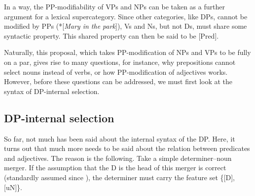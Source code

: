 \documentclass[output=paper
,modfonts
,nonflat]{langsci/langscibook}
\begin{document}
\begin{figure}[!h]
	\begin{exe}
	\end{exe}
\end{figure} 
\noindent In a way, the PP-modifiability of VPs and NPs can be taken as a further argument for a lexical supercategory. Since other categories, like DPs, cannot be modified by PPs (*[\textit{Mary in the park}]), Vs and Ns, but not Ds, must share some syntactic property. This shared property can then be said to be [Pred].

Naturally, this proposal, which takes PP-modification of NPs and VPs to be fully on a par, gives rise to many questions, for instance, why prepositions cannot select nouns instead of verbs, or how PP-modification of adjectives works. However, before these questions can be addressed, we must first look at the syntax of DP-internal selection.

\subsection{DP-internal selection}
So far, not much has been said about the internal syntax of the DP. Here, it turns out that much more needs to be said about the relation between predicates and adjectives. The reason is the following. Take a simple determiner–noun merger. If the assumption that the D is the head of this merger is correct (standardly assumed since \citealt{Abney1987}), the determiner must carry the feature set \{[D], [uN]\}.  
\end{document}
